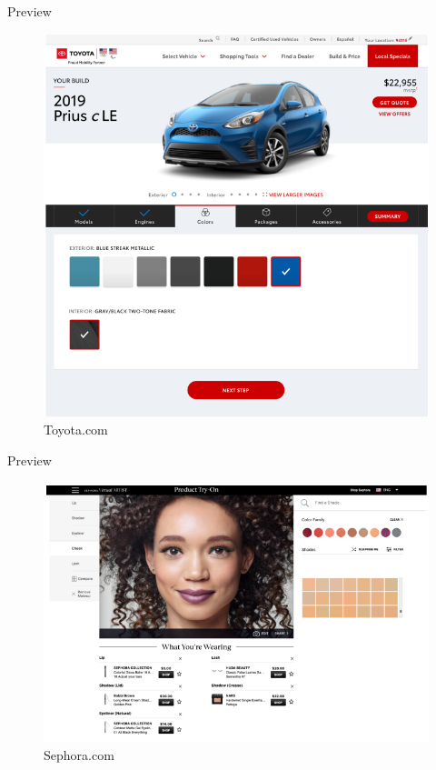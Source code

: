 \documentclass{beamer}
\begin{document}
\begin{frame}[t]{Preview}
	\begin{figure}[h]
		\centering
		\includegraphics[scale=0.6]{images/lec08-pic17.png}
		\caption{Toyota.com}
	\end{figure}
\end{frame}

\begin{frame}[t]{Preview}
	\begin{figure}[h]
		\centering
		\includegraphics[scale=0.6]{images/lec08-pic18.png}
		\caption{Sephora.com}
	\end{figure}
\end{frame}
\end{document}
